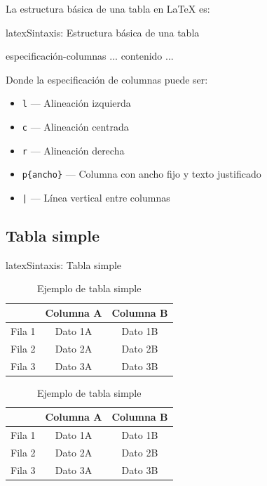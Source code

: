La estructura básica de una tabla en \LaTeX{} es:

\begin{codigosimple}{latex}{Sintaxis: Estructura básica de una tabla}
\begin{table}[posición]
  \centering
  \caption{Título de la tabla}
  \label{tab:etiqueta}
  \begin{tabular}{especificación-columnas}
    ... contenido ...
  \end{tabular}
\end{table}
\end{codigosimple}

Donde la especificación de columnas puede ser:
\begin{itemize}
  \item \texttt{l} --- Alineación izquierda
  \item \texttt{c} --- Alineación centrada
  \item \texttt{r} --- Alineación derecha
  \item \texttt{p\{ancho\}} --- Columna con ancho fijo y texto justificado
  \item \texttt{|} --- Línea vertical entre columnas
\end{itemize}

\subsection{Tabla simple}
\label{subsec:tabla-simple}

\begin{codigosimple}{latex}{Sintaxis: Tabla simple}
\begin{table}[htbp]
  \centering
  \begin{tabular}{lcc}
    \toprule
           & Columna A & Columna B \\
    \midrule
    Fila 1 & Dato 1A   & Dato 1B \\
    Fila 2 & Dato 2A   & Dato 2B \\
    Fila 3 & Dato 3A   & Dato 3B \\
    \bottomrule
  \end{tabular}
  \caption{Ejemplo de tabla simple}
  \label{tab:ejemplo}
\end{table}
\end{codigosimple}

\begin{table}[htbp]
  \centering
  \EPScabeceraTabla
  \begin{tabular}{lcc}
    \toprule
               & Columna A & Columna B \\
    \midrule
    Fila 1 & Dato 1A   & Dato 1B \\
    Fila 2 & Dato 2A   & Dato 2B \\
    Fila 3 & Dato 3A   & Dato 3B \\
    \bottomrule
  \end{tabular}
  \caption{Ejemplo de tabla simple}
  \label{tab:simple-ejemplo}
\end{table}

